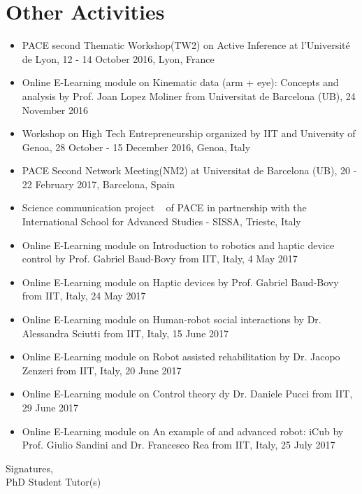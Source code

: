 \documentclass[12pt,a4paper]{report}
\begin{document}
\section{Other Activities}
\begin{itemize}
    \item PACE second Thematic Workshop(TW2) on Active Inference at l’Université de Lyon, 12 - 14 October 2016, Lyon, France
    \item Online E-Learning module on Kinematic data (arm + eye): Concepts and analysis by Prof. Joan Lopez Moliner from Universitat de Barcelona (UB), 24 November 2016
    \item Workshop on High Tech Entrepreneurship organized by IIT and University of Genoa, 28 October - 15 December 2016, Genoa, Italy
    \item PACE Second Network Meeting(NM2) at  Universitat de Barcelona (UB), 20 - 22 February 2017, Barcelona, Spain
    \item Science communication project ~\cite{SCP} of PACE in partnership with the International School for Advanced Studies - SISSA, Trieste, Italy
    \item Online E-Learning module on Introduction to robotics and haptic device control by Prof. Gabriel Baud-Bovy from IIT, Italy, 4 May 2017
    \item Online E-Learning module on Haptic devices by Prof. Gabriel Baud-Bovy from IIT, Italy, 24 May 2017
    \item Online E-Learning module on Human-robot social interactions by Dr. Alessandra Sciutti from IIT, Italy, 15 June 2017
    \item Online E-Learning module on Robot assisted rehabilitation by Dr. Jacopo Zenzeri from IIT, Italy, 20 June 2017
    \item Online E-Learning module on Control theory dy Dr. Daniele Pucci from IIT, 29 June 2017
    \item Online E-Learning module on An example of and advanced robot: iCub by Prof. Giulio Sandini and Dr. Francesco Rea from IIT, Italy, 25 July 2017
\end{itemize}
\vspace*{10cm}
Signatures, \\
\vspace*{4cm}
PhD Student \hspace*{12cm} Tutor(s)
\end{document}
